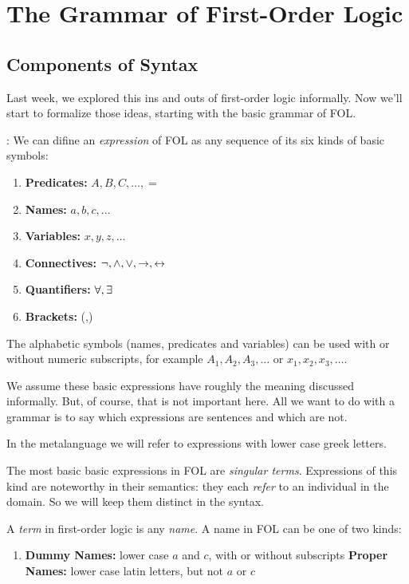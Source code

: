 \section{The Grammar of First-Order Logic}

\subsection{Components of Syntax}

Last week, we explored this ins and outs of first-order logic informally. Now
we'll start to formalize those ideas, starting with the basic grammar of FOL.

\begin{definition}: We can difine an
  \label{def:fol-expression}
  \emph{expression} of FOL as any sequence of its six kinds of basic symbols:\\
  \begin{enumerate}
    \item \textbf{Predicates:} $A,B,C,\dots,=$
    \item \textbf{Names:} $a,b,c,\dots$
    \item \textbf{Variables:} $x,y,z,\dots$
    \item \textbf{Connectives:} $\neg,\wedge,\vee,\rightarrow,\leftrightarrow$ 
    \item \textbf{Quantifiers:} $\forall,\exists$
    \item \textbf{Brackets:} (,)
  \end{enumerate}
  The alphabetic symbols (names, predicates and variables) can be used with
  or without numeric subscripts, for example $A_1, A_2, A_3, \dots$ or
  $x_1, x_2, x_3, \dots$.
\end{definition}

We assume these basic expressions have roughly the meaning discussed informally.
But, of course, that is not important here. All we want to do with a grammar is
to say which expressions are sentences and which are not.

In the metalanguage we will refer to expressions with lower case greek letters.

The most basic basic expressions in FOL are \emph{singular terms}. Expressions
of this kind are noteworthy in their semantics: they each \emph{refer} to an
individual in the domain. So we will keep them distinct in the syntax.

\begin{definition}[Term]
  \label{def:fol-term}
  A \emph{term} in first-order logic is any \emph{name}. A name in FOL can be
  one of two kinds:
  \begin{enumerate}
  \item
    \textbf{Dummy Names:} lower case $a$ and $c$, with or without subscripts
    \textbf{Proper Names:} lower case latin letters, but not $a$ or $c$
  \end{enumerate}
\end{definition}

